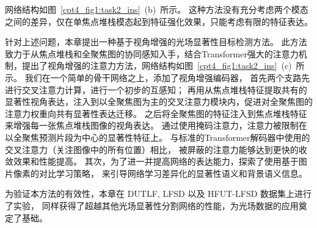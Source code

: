 网络结构如图~\ref{cpt4_fig1:task2_ins}~(b)~所示。
%
%
这种方法没有充分考虑两个模态之间的差异，仅在单焦点堆栈模态起到特征强化效果，只能考虑有限的特征表达。
% 
% 
% 
% 
\par
%
%
针对上述问题，本章提出一种基于视角增强的光场显著性目标检测方法。
此方法致力于从焦点堆栈和全聚焦图的协同感知入手，结合Transformer强大的注意力机制，提出了视角增强的注意力方法，网络结构如图~\ref{cpt4_fig1:task2_ins}~(c)~所示。
我们在一个简单的骨干网络之上，添加了视角增强编码器，
首先两个支路先进行交叉注意力计算，进行一个初步的互感知；
再用从焦点堆栈特征提取共有的显著性视角表达，注入到以全聚焦图为主的交叉注意力模块内，促进对全聚焦图的注意力权重向共有显著性表达迁移。
之后将全聚焦图的特征注入到焦点堆栈特征来增强每一张焦点堆栈图像的视角表达。
通过使用掩码注意力，注意力被限制在以全聚焦预测片段为中心的显著性特征上。
与标准的Transformer解码器中使用的交叉注意力（关注图像中的所有位置）相比，
被屏蔽的注意力能够达到更快的收敛效果和性能提高。
其次，为了进一并提高网络的表达能力，探索了使用基于图片像素的对比学习策略，
来引导网络学习差异化的显著性语义和背景语义信息。
%
%
\par
% 
% 
% 
% 
为验证本方法的有效性，本章在 DUTLF, LFSD 以及 HFUT-LFSD 数据集上进行了实验，
同样获得了超越其他光场显著性分割网络的性能，为光场数据的应用奠定了基础。
% 
% 
% 
% 
% 
% 
% 
% 
% 
% 
%
%
%
%
%
